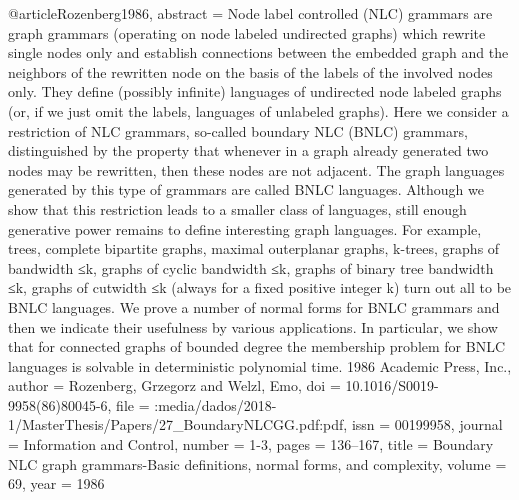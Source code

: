 @article{Rozenberg1986,
	abstract = {Node label controlled (NLC) grammars are graph grammars (operating on node labeled undirected graphs) which rewrite single nodes only and establish connections between the embedded graph and the neighbors of the rewritten node on the basis of the labels of the involved nodes only. They define (possibly infinite) languages of undirected node labeled graphs (or, if we just omit the labels, languages of unlabeled graphs). Here we consider a restriction of NLC grammars, so-called boundary NLC (BNLC) grammars, distinguished by the property that whenever in a graph already generated two nodes may be rewritten, then these nodes are not adjacent. The graph languages generated by this type of grammars are called BNLC languages. Although we show that this restriction leads to a smaller class of languages, still enough generative power remains to define interesting graph languages. For example, trees, complete bipartite graphs, maximal outerplanar graphs, k-trees, graphs of bandwidth ≤k, graphs of cyclic bandwidth ≤k, graphs of binary tree bandwidth ≤k, graphs of cutwidth ≤k (always for a fixed positive integer k) turn out all to be BNLC languages. We prove a number of normal forms for BNLC grammars and then we indicate their usefulness by various applications. In particular, we show that for connected graphs of bounded degree the membership problem for BNLC languages is solvable in deterministic polynomial time. {\textcopyright} 1986 Academic Press, Inc.},
	author = {Rozenberg, Grzegorz and Welzl, Emo},
	doi = {10.1016/S0019-9958(86)80045-6},
	file = {:media/dados/2018-1/MasterThesis/Papers/27{\_}BoundaryNLCGG.pdf:pdf},
	issn = {00199958},
	journal = {Information and Control},
	number = {1-3},
	pages = {136--167},
	title = {{Boundary NLC graph grammars-Basic definitions, normal forms, and complexity}},
	volume = {69},
	year = {1986}
}